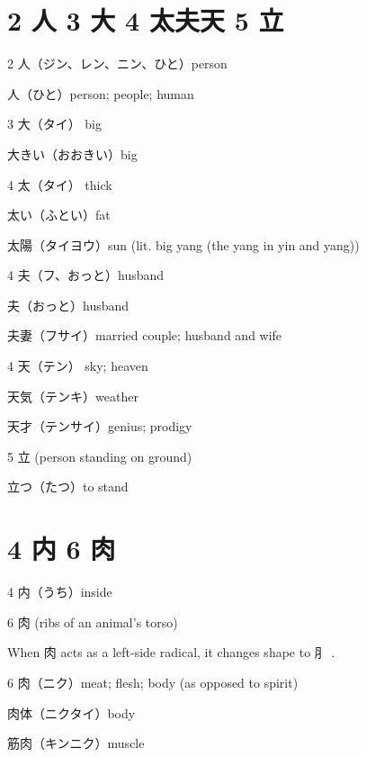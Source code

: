 \section{2 人 3 大 4 太夫天 5 立}

2 人（ジン、レン、ニン、ひと）person

人（ひと）person; people; human

3 大（タイ） big

大きい（おおきい）big

4 太（タイ） thick

太い（ふとい）fat

太陽（タイヨウ）sun (lit. big yang (the yang in yin and yang))

4 夫（フ、おっと）husband

夫（おっと）husband

夫妻（フサイ）married couple; husband and wife

4 天（テン） sky; heaven

天気（テンキ）weather

天才（テンサイ）genius; prodigy

5 立 (person standing on ground)

立つ（たつ）to stand

\section{4 内 6 肉}

4 内（うち）inside

6 肉 (ribs of an animal's torso)

When 肉 acts as a left-side radical, it changes shape to ⺼ .

6 肉（ニク）meat; flesh; body (as opposed to spirit)

肉体（ニクタイ）body

筋肉（キンニク）muscle
